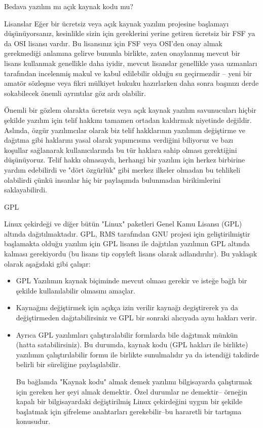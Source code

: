\begin{section}{Bedava yazılım mı açık kaynak kodu mu?}
\begin{subsection}{Lisanslar}
Eğer bir ücretsiz veya açık kaynak yazılım projesine başlamayı düşünüyorsanız, kesinlikle sizin için  gereklerini yerine getiren ücretsiz bir FSF ya da OSI lisansı vardır. Bu lisansınız için FSF veya OSI'den onay almak gerekmediği anlamına gelirve bununla birlikte, zaten onaylanmış mevcut bir lisans kullanmak genellikle daha iyidir, mevcut lisanslar genellikle yasa uzmanları tarafından incelenmiş makul ve kabul edilebilir olduğu su geçirmezdir -- yeni bir amatör sözleşme veya fikri mülkiyet hukuku hazırlarken daha sonra başınızı derde sokabilecek önemli ayrıntılar göz ardı olabilir.

Önemli bir gözlem olarakta ücretsiz veya açık kaynak yazılım savunucuları hiçbir şekilde  yazılım için telif hakkını tamamen ortadan kaldırmak niyetinde değildir. Aslında, özgür yazılımcılar olarak biz telif hakklarının yazılımın değiştirme ve dağıtma gibi haklarını yasal olarak yapımcısına verdiğini biliyoruz ve bazı koşullar sağlanarak kullanıcılarında bu tür haklara sahip olması gerektiğini düşünüyoruz. Telif hakkı olmasaydı, herhangi bir yazılım için herkez birbirine yardım edebilirdi ve "dört özgürlük" gibi merkez ilkeler olmadan bu tehlikeli olabilirdi çünkü insanlar hiç bir paylaşımda bulunmadan birikimlerini saklayabilirdi.
\end{subsection}
\begin{subsection}{GPL}

Linux çekirdeği ve diğer bütün "Linux" paketleri Genel Kamu Lisansı (GPL) altında dağıtılmaktadır. GPL, RMS tarafından GNU projesi için geliştirilmiştir başlamakta olduğu yazılım için GPL lisansı ile dağıtılan yazılımın GPL altında kalması gerekiyordu (bu lisans tip copyleft lisans olarak adlandırılır). Bu yaklaşık olarak aşağıdaki gibi çalışır:

\begin{itemize}
 \item GPL Yazılımın kaynak biçiminde mevcut olması gerekir ve isteğe bağlı bir şekilde kullanılabilir olmasını amaçlar.
 \item Kaynağını değiştirmek için açıkça izin verilir kaynağı degiştirerek ya da değiştirmeden dağıtabilirsiniz ve GPL bir sonraki alıcıyada aynı hakları verir.
 \item Ayrıca  GPL yazılımları çalıştıralabilir  formlarda bile dağıtmak münkün (hatta satabilirsiniz). Bu durumda, kaynak kodu (GPL hakları ile birlikte) yazılımın çalıştırılabilir formu ile birlikte sunulmalıdır ya da istendiği takdirde belirli bir süreliğine paylaşılabilir.

Bu bağlamda "Kaynak kodu" almak demek yazılımı bilgisayarda çalıştırmak için gereken her şeyi almak demektir. Özel durumlar ne demektir-- örneğin kapalı bir bilgisayardaki değiştirilmiş Linux çekirdeğini uygun bir şekilde başlatmak için şifreleme anahtarları gerekebilir--bu hararetli bir tartışma konusudur.


\end{itemize}
\end{subsection}
\end{section}
